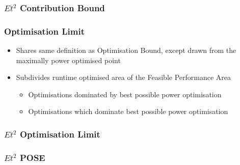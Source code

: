 \documentclass{beamer}
\begin{document}
  \begin{frame}
    \frametitle{$Et^2$ Contribution Bound}
    \newcommand*{\OPTBOUND}{}%
    \newcommand*{\CONTBOUND}{}%
    \begin{figure}
    \centering
    
    \end{figure}
  \end{frame}


  \begin{frame}
    \frametitle{Optimisation Limit}
    \begin{itemize}
      \item Shares same definition as Optimisation Bound, except drawn from the maximally power optimised point
      \item Subdivides runtime optimised area of the Feasible Performance Area
      \begin{itemize}
        \item Optimisations dominated by best possible power optimisation
        \item Optimisations which dominate best possible power optimisation
      \end{itemize}
    \end{itemize}
  \end{frame}

  \begin{frame}
    \frametitle{$Et^2$ Optimisation Limit}
    \newcommand*{\OPTBOUND}{}%
    \newcommand*{\CONTBOUND}{}%
    \newcommand*{\OPTLIMIT}{}%
    \begin{figure}
    \centering
    
    \end{figure}
  \end{frame}

  \begin{frame}
    \frametitle{$Et^2$ POSE}
    \newcommand*{\OPTBOUND}{}%
    \newcommand*{\CONTBOUND}{}%
    \newcommand*{\OPTLIMIT}{}%
    \newcommand*{\POSELABELS}{}%
    \begin{figure}
    \centering
    
    \end{figure}
  \end{frame}
\end{document}
